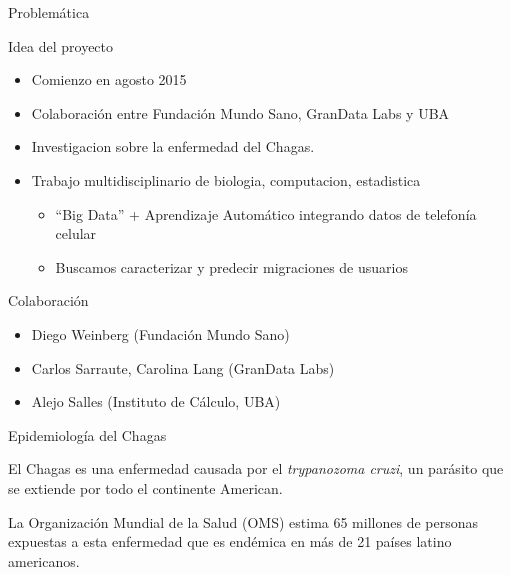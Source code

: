 \documentclass{beamer}
\begin{document}
\begin{frame}{Problemática}

	\begin{block}{Idea del proyecto}
		\begin{itemize}

			\item Comienzo en agosto 2015
			\item Colaboración entre Fundación Mundo Sano, GranData Labs y UBA
			\item Investigacion sobre la enfermedad del Chagas.
			\item Trabajo multidisciplinario de biologia, computacion, estadistica
			\begin{itemize}
				\item ``Big Data'' + Aprendizaje Automático integrando datos de telefonía celular
				\item  Buscamos caracterizar y predecir migraciones de usuarios
			\end{itemize}
		\end{itemize}
	\end{block}

	\pause

	\begin{block}{ Colaboración}
		\begin{itemize}
			\item Diego Weinberg (Fundación Mundo Sano)
			\item Carlos Sarraute, Carolina Lang (GranData Labs)
			\item Alejo Salles (Instituto de Cálculo, UBA)
		\end{itemize}
	\end{block}

\end{frame}


\begin{frame}{ Epidemiología del Chagas}

			El Chagas es una enfermedad causada por el \textit{trypanozoma cruzi}, un parásito que se extiende por todo el continente American.

			\medskip  La Organización Mundial de la Salud (OMS) estima 65 millones de personas expuestas a esta enfermedad que es endémica en más de 21 países latino americanos.

\end{frame}
\end{document}
